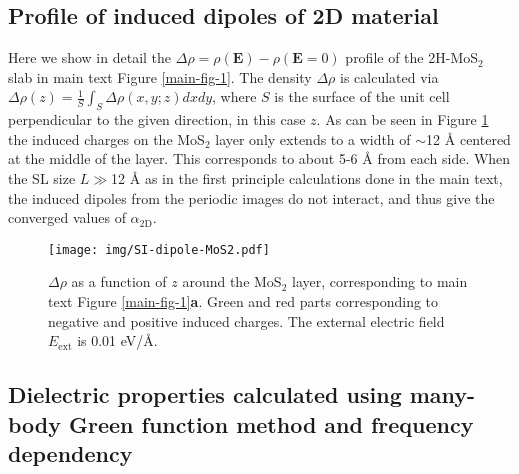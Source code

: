 \documentclass[manuscript=suppinfo,email=true,hyperref=true,keywords=false]{achemso}
\begin{document}
\subsection{Profile of induced dipoles of 2D material}
\label{sec:dipole-plot}
Here we show in detail the
$\Delta {\rho}=\rho(\boldsymbol{E}) - \rho(\boldsymbol{E}=0)$ profile of
the 2H-MoS$_{2}$ slab in main text Figure \ref{main-fig-1}. The
density $\Delta \rho$ is calculated via $\Delta \rho(z) = \frac{1}{S} \int_{S} \Delta \rho (x,y;z) dx dy $, 
where $S$ is the surface of the unit cell perpendicular to the given direction, in this case $z$. 
%
As can be seen in Figure \ref{fig:rho-profile} the induced charges on
the MoS$_{2}$ layer only extends to a width of $\sim{}$12 \AA{}
centered at the middle of the layer. This corresponds to about 5-6 \AA
from each side.  When the SL size $L \gg$12 \AA{} as in the first
principle calculations done in the main text, the induced dipoles from
the periodic images do not interact, and thus give the converged
values of $\alpha_{\mathrm{2D}}$.

\begin{figure}[htbp]
 \centering
 \texttt{[image: img/SI-dipole-MoS2.pdf]}
 \caption{$\Delta \rho$ as a function of $z$ around the
   MoS$_{2}$ layer, corresponding to main text Figure
   \ref{main-fig-1}\textbf{a}. Green and red parts corresponding to negative and
   positive induced charges. The external electric field
   $E_{\mathrm{ext}}$ is 0.01 eV/\AA{}.}
 \label{fig:rho-profile}
\end{figure}

\subsection{Dielectric properties calculated using many-body Green function method and frequency dependency}
\label{ssec:gw}
\end{document}
